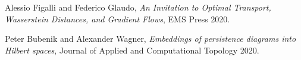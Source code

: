 \documentclass[11pt,a4paper,draft]{article}
\begin{document}
\begin{thebibliography}{9}

    Alessio Figalli and Federico Glaudo,
    \textit{An Invitation to Optimal Transport, Wasserstein Distances, and Gradient Flows},
    EMS Press 2020.

    Peter Bubenik and Alexander Wagner,
    \textit{Embeddings of persistence diagrams into Hilbert spaces},
    Journal of Applied and Computational Topology 2020.
    
\end{thebibliography}
\end{document}

